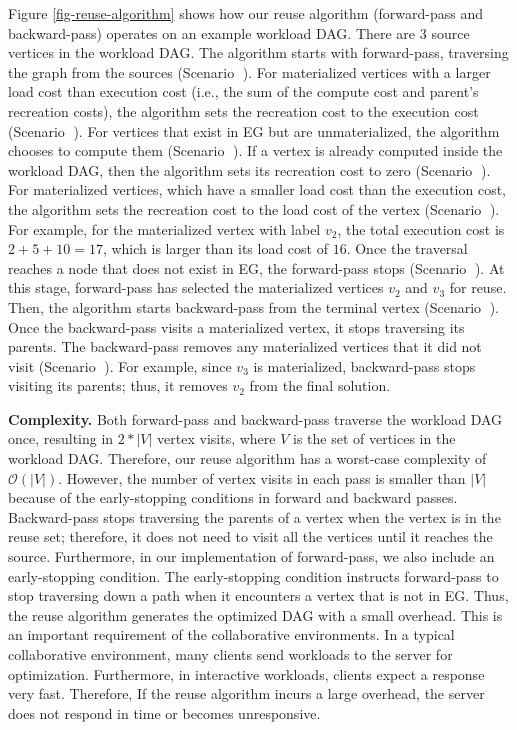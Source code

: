Figure \ref{fig-reuse-algorithm} shows how our reuse algorithm (forward-pass and backward-pass) operates on an example workload DAG.
There are 3 source vertices in the workload DAG.
The algorithm starts with forward-pass, traversing the graph from the sources (Scenario \textcircled{}).
For materialized vertices with a larger load cost than execution cost (i.e., the sum of the compute cost and parent's recreation costs), the algorithm sets the recreation cost to the execution cost (Scenario \textcircled{}).
For vertices that exist in EG but are unmaterialized, the algorithm chooses to compute them (Scenario \textcircled{}).
If a vertex is already computed inside the workload DAG, then the algorithm sets its recreation cost to zero (Scenario \textcircled{}).
For materialized vertices, which have a smaller load cost than the execution cost, the algorithm sets the recreation cost to the load cost of the vertex (Scenario \textcircled{}).
For example, for the materialized vertex with label $v_2$, the total execution cost is $2 + 5 + 10 = 17$, which is larger than its load cost of $16$.
Once the traversal reaches a node that does not exist in EG, the forward-pass stops (Scenario \textcircled{}).
At this stage, forward-pass has selected the materialized vertices $v_2$ and $v_3$ for reuse.
Then, the algorithm starts backward-pass from the terminal vertex (Scenario \textcircled{}).
Once the backward-pass visits a materialized vertex, it stops traversing its parents.
The backward-pass removes any materialized vertices that it did not visit (Scenario \textcircled{}).
For example, since $v_3$ is materialized, backward-pass stops visiting its parents; thus, it removes $v_2$ from the final solution.

\textbf{Complexity.} 
Both forward-pass and backward-pass traverse the workload DAG once, resulting in $2*|V|$ vertex visits, where $V$ is the set of vertices in the workload DAG.
Therefore, our reuse algorithm has a worst-case complexity of $\mathcal{O}(|V|)$.
However, the number of vertex visits in each pass is smaller than $|V|$ because of the early-stopping conditions in forward and backward passes.
Backward-pass stops traversing the parents of a vertex when the vertex is in the reuse set; therefore, it does not need to visit all the vertices until it reaches the source.
Furthermore, in our implementation of forward-pass, we also include an early-stopping condition.
The early-stopping condition instructs forward-pass to stop traversing down a path when it encounters a vertex that is not in EG.
Thus, the reuse algorithm generates the optimized DAG with a small overhead.
This is an important requirement of the collaborative environments.
In a typical collaborative environment, many clients send workloads to the server for optimization.
Furthermore, in interactive workloads, clients expect a response very fast.
Therefore, If the reuse algorithm incurs a large overhead, the server does not respond in time or becomes unresponsive.
